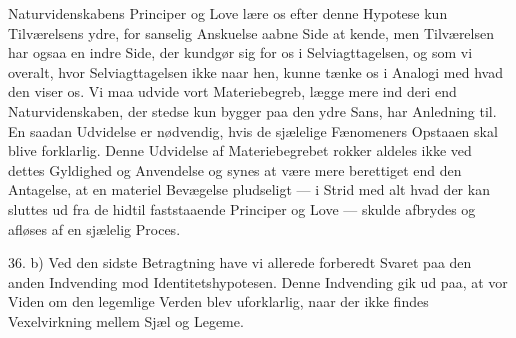 \documentclass[12pt,a4paper,openany]{book}
\newcommand{\opage}[1]{\marginnote{\footnotesize\textit{[#1]}}}
\begin{document}
Naturvidenskabens Principer og Love lære os efter denne Hypotese kun
Tilværelsens ydre, for sanselig Anskuelse aabne Side at kende, men Tilværelsen
har ogsaa en indre Side, der kundgør sig for os i Selviagttagelsen, og som vi
overalt, hvor Selviagttagelsen ikke naar hen, kunne tænke os i Analogi med hvad
den viser os. Vi maa udvide vort Materiebegreb, lægge mere ind deri end
Naturvidenskaben, der stedse kun bygger paa den ydre Sans, har Anledning til.
En saadan Udvidelse er nødvendig, hvis de sjælelige Fænomeners Opstaaen skal
blive forklarlig. Denne Udvidelse af Materiebegrebet rokker aldeles ikke ved
dettes Gyldighed og Anvendelse og synes at være mere berettiget end den
Antagelse, at en materiel Bevægelse pludseligt --- i Strid med alt hvad der kan
sluttes ud fra de hidtil faststaaende Principer og Love --- skulde afbrydes og
afløses af en sjælelig Proces.

\setcounter{footnote}{0}%
\opage{87}36. b) Ved den sidste Betragtning have vi allerede forberedt Svaret
paa den anden Indvending mod Identitetshypotesen. Denne Indvending gik ud paa,
at vor Viden om den legemlige Verden blev uforklarlig, naar der ikke findes
Vexelvirkning mellem Sjæl og Legeme.
\end{document}
